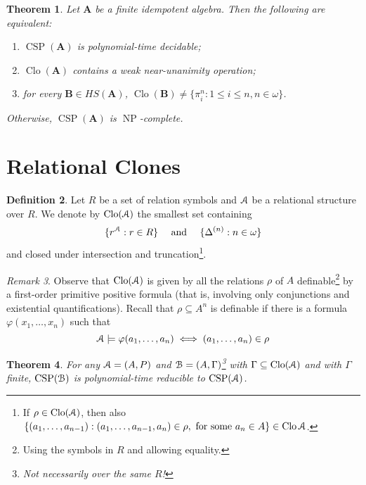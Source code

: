 \documentclass{amsart}
\theoremstyle{plain}
\newtheorem{theorem}{Theorem}[section]
\theoremstyle{definition}
\newtheorem{definition}[theorem]{Definition}
\theoremstyle{remark}
\newtheorem{remark}[theorem]{Remark}
\def\phi{\varphi}
\DeclareMathOperator{\Clo}{Clo}
\DeclareMathOperator{\CSP}{CSP}
\DeclareMathOperator{\NP}{NP}
\begin{document}
\begin{theorem}
    Let $\mathbf{A}$ be a finite idempotent algebra. 
    Then the following are equivalent: 
    \begin{enumerate}
        \item $\CSP(\mathbf{A})$ is polynomial-time decidable; 
        \item $\Clo(\mathbf{A})$ contains a weak near-unanimity operation; 
        \item for every $\mathbf{B} \in HS(\mathbf{A})$, $\Clo(\mathbf{B}) \neq \{\pi^n_i: 1 \le i \le n, n \in \omega\}$. 
    \end{enumerate}
    Otherwise, $\CSP(\mathbf{A})$ is $\NP$-complete. 
\end{theorem}

\section{Relational Clones} 
\begin{definition}
    Let $R$ be a set of relation symbols and $\EuScript{A}$ be a relational structure over $R$.
    We denote by $\Clo(\EuScript{A})$ the smallest set containing 
    \begin{equation*}
        \{r^\EuScript{A} : r \in R\} \quad \text{ and } \quad \{\Delta^{(n)} : n \in \omega\}
    \end{equation*}
    and closed under intersection and truncation\footnote{If $\rho \in \Clo(\EuScript{A})$, then also $\{(a_1, \ldots, a_{n-1}): (a_1, \ldots, a_{n-1}, a_n) \in \rho, \text{ for some } a_n \in A \} \in \Clo{\EuScript{A}}$.}.
\end{definition}

\begin{remark}
    Observe that $\Clo(\EuScript{A})$ is given by all the relations $\rho$ of $A$ definable\footnote{Using the symbols in $R$ and allowing equality.} by a first-order primitive positive formula
    (that is, involving only conjunctions and existential quantifications). 
    Recall that $\rho \subseteq A^n$ is definable if there is a formula $\phi(x_1, \ldots, x_n)$ such that 
    \begin{equation*}
        \EuScript{A} \models \phi(a_1, \ldots, a_n) \iff (a_1, \ldots, a_n) \in \rho
    \end{equation*}
\end{remark}

\begin{theorem}
    For any $\EuScript{A}=(A,P)$ and $\EuScript{B}=(A,\Gamma)$\footnote{Not necessarily over the same $R$!} with $\Gamma \subseteq \Clo(\EuScript{A})$ and with $\Gamma$ finite, $\CSP(\EuScript{B})$ is polynomial-time reducible to $\CSP(\EuScript{A})$. 
\end{theorem}
\end{document}
